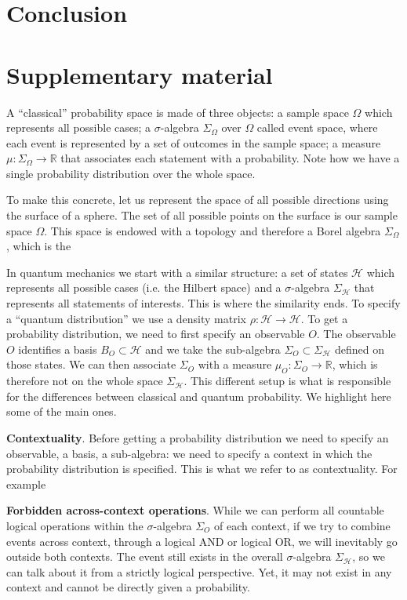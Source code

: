 \documentclass[10pt,twocolumn, nofootinbib]{revtex4-2}
\begin{document}
\section{Conclusion}

\section*{Supplementary material}


A ``classical'' probability space is made of three objects: a sample space $\Omega$ which represents all possible cases; a $\sigma$-algebra $\Sigma_\Omega$ over $\Omega$ called event space, where each event is represented by a set of outcomes in the sample space; a measure $\mu : \Sigma_\Omega \to \mathbb{R}$ that associates each statement with a probability. Note how we have a single probability distribution over the whole space.

To make this concrete, let us represent the space of all possible directions using the surface of a sphere. The set of all possible points on the surface is our sample space $\Omega$. This space is endowed with a topology and therefore a Borel algebra $\Sigma_\Omega$, which is the

In quantum mechanics we start with a similar structure: a set of states $\mathcal{H}$ which represents all possible cases (i.e. the Hilbert space) and a $\sigma$-algebra $\Sigma_{\mathcal{H}}$ that represents all statements of interests. This is where the similarity ends. To specify a ``quantum distribution'' we use a density matrix $\rho : \mathcal{H} \to \mathcal{H}$. To get a probability distribution, we need to first specify an observable $O$. The observable $O$ identifies a basis $B_O \subset \mathcal{H}$ and we take the sub-algebra $\Sigma_O \subset \Sigma_{\mathcal{H}}$ defined on those states. We can then associate $\Sigma_O$ with a measure $\mu_O : \Sigma_O \to \mathbb{R}$, which is therefore not on the whole space $\Sigma_{\mathcal{H}}$. This different setup is what is responsible for the differences between classical and quantum probability. We highlight here some of the main ones.

\textbf{Contextuality}. Before getting a probability distribution we need to specify an observable, a basis, a sub-algebra: we need to specify a context in which the probability distribution is specified. This is what we refer to as contextuality. For example

\textbf{Forbidden across-context operations}. While we can perform all countable logical operations within the $\sigma$-algebra $\Sigma_{O}$ of each context, if we try to combine events across context, through a logical AND or logical OR, we will inevitably go outside both contexts. The event still exists in the overall $\sigma$-algebra $\Sigma_{\mathcal{H}}$, so we can talk about it from a strictly logical perspective. Yet, it may not exist in any context and cannot be directly given a probability.
\end{document}
